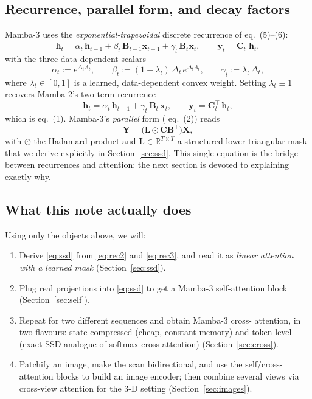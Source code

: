 \documentclass[11pt,a4paper]{article}
\begin{document}
\subsection{Recurrence, parallel form, and decay factors}

Mamba-3 uses the \emph{exponential-trapezoidal} discrete recurrence of
\cite{mamba3} eq.~(5)–(6):
\begin{equation}\label{eq:rec3}
  \bm{h}_t = \alpha_t\,\bm{h}_{t-1}
            + \beta_t\,\bm{B}_{t-1}\bm{x}_{t-1}
            + \gamma_t\,\bm{B}_t\bm{x}_t,
  \qquad
  \bm{y}_t = \bm{C}_t^\top\bm{h}_t,
\end{equation}
with the three data-dependent scalars
\begin{equation}\label{eq:abc}
  \alpha_t := e^{\Delta_t A_t},
  \qquad
  \beta_t  := (1 - \lambda_t)\,\Delta_t\,e^{\Delta_t A_t},
  \qquad
  \gamma_t := \lambda_t\,\Delta_t,
\end{equation}
where $\lambda_t \in [0,1]$ is a learned, data-dependent convex weight.
Setting $\lambda_t \equiv 1$ recovers Mamba-2's two-term recurrence
\begin{equation}\label{eq:rec2}
  \bm{h}_t = \alpha_t\,\bm{h}_{t-1} + \gamma_t\,\bm{B}_t\,\bm{x}_t,
  \qquad
  \bm{y}_t = \bm{C}_t^\top\,\bm{h}_t,
\end{equation}
which is \cite{mamba3} eq.~(1). Mamba-3's \emph{parallel} form
(\cite{mamba3} eq.~(2)) reads
\begin{equation}\label{eq:ssd}
  \bm{Y} = \bigl(\bm{L}\odot\bm{C}\bm{B}^\top\bigr)\bm{X},
\end{equation}
with $\odot$ the Hadamard product and $\bm{L}\in\mathbb{R}^{T\times T}$
a structured lower-triangular mask that we derive explicitly in
Section~\ref{sec:ssd}. This single equation is the bridge between
recurrences and attention: the next section is devoted to explaining
exactly why.

\subsection{What this note actually does}

Using only the objects above, we will:

\begin{enumerate}
  \item Derive \eqref{eq:ssd} from \eqref{eq:rec2} and
        \eqref{eq:rec3}, and read it as \emph{linear attention with a
        learned mask} (Section~\ref{sec:ssd}).
  \item Plug real projections into \eqref{eq:ssd} to get a Mamba-3
        self-attention block (Section~\ref{sec:self}).
  \item Repeat for two different sequences and obtain Mamba-3 cross-
        attention, in two flavours: state-compressed (cheap,
        constant-memory) and token-level (exact SSD analogue of
        softmax cross-attention) (Section~\ref{sec:cross}).
  \item Patchify an image, make the scan bidirectional, and use the
        self/cross-attention blocks to build an image encoder; then
        combine several views via cross-view attention for the 3-D
        setting (Section~\ref{sec:images}).
\end{enumerate}
\end{document}
